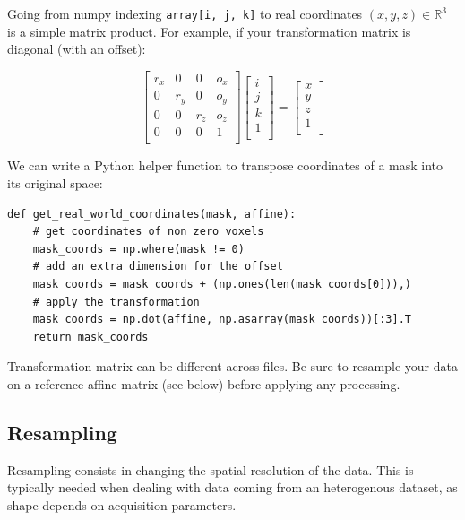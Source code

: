 \documentclass{frontiersSCNS} %
\begin{document}
Going from
numpy indexing \verb!array[i, j, k]! to real coordinates $(x, y, z) \in
\mathbb{R}^3$ is a simple matrix product. For example, if your transformation
matrix is diagonal (with an offset):

\[
    \begin{bmatrix}
        r_x & 0   & 0   & o_x \\
        0   & r_y & 0   & o_y \\
        0   & 0   & r_z & o_z \\
        0   & 0   & 0   & 1   \\
    \end{bmatrix}
    \begin{bmatrix}
        i \\
        j \\
        k \\
        1 \\
    \end{bmatrix}
    =
    \begin{bmatrix}
        x \\
        y \\
        z \\
        1 \\
    \end{bmatrix}
\]

We can write a Python helper function to transpose coordinates of a mask into
its original space:


\begin{lstlisting}
def get_real_world_coordinates(mask, affine):
    # get coordinates of non zero voxels
    mask_coords = np.where(mask != 0)
    # add an extra dimension for the offset
    mask_coords = mask_coords + (np.ones(len(mask_coords[0])),)
    # apply the transformation
    mask_coords = np.dot(affine, np.asarray(mask_coords))[:3].T
    return mask_coords
\end{lstlisting}

Transformation matrix can be different across files. Be sure to resample your
data on a reference affine matrix (see below) before applying any processing.

\subsection{Resampling}
\label{resampling}

Resampling consists in changing the spatial resolution of the data. This is
typically needed
when dealing with data coming from an heterogenous dataset, as shape depends
on acquisition parameters.
\end{document}
